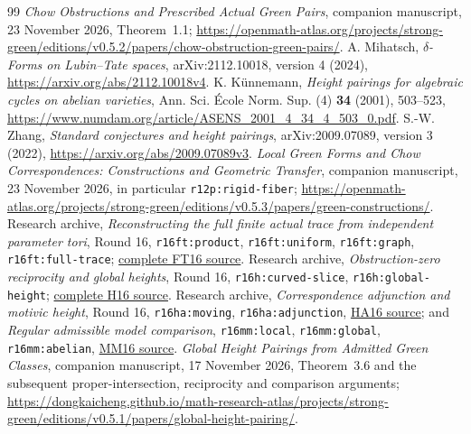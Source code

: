 \documentclass[11pt]{article}
\theoremstyle{definition}
\numberwithin{equation}{section}
\begin{document}
\begin{thebibliography}{99}
 \emph{Chow Obstructions and Prescribed Actual Green Pairs}, companion manuscript, 23 November 2026, Theorem~1.1; \url{https://openmath-atlas.org/projects/strong-green/editions/v0.5.2/papers/chow-obstruction-green-pairs/}.
 A. Mihatsch, \emph{$\delta$-Forms on Lubin--Tate spaces}, arXiv:2112.10018, version 4 (2024), \url{https://arxiv.org/abs/2112.10018v4}.
 K. K\"unnemann, \emph{Height pairings for algebraic cycles on abelian varieties}, Ann. Sci. \'Ecole Norm. Sup. (4) \textbf{34} (2001), 503--523, \url{https://www.numdam.org/article/ASENS_2001_4_34_4_503_0.pdf}.
 S.-W. Zhang, \emph{Standard conjectures and height pairings}, arXiv:2009.07089, version 3 (2022), \url{https://arxiv.org/abs/2009.07089v3}.
 \emph{Local Green Forms and Chow Correspondences: Constructions and Geometric Transfer}, companion manuscript, 23 November 2026, in particular \texttt{r12p:rigid-fiber}; \url{https://openmath-atlas.org/projects/strong-green/editions/v0.5.3/papers/green-constructions/}.
 Research archive, \emph{Reconstructing the full finite actual trace from independent parameter tori}, Round 16, \texttt{r16ft:product}, \texttt{r16ft:uniform}, \texttt{r16ft:graph}, \texttt{r16ft:full-trace}; \href{https://openmath-atlas.org/projects/strong-green/editions/v0.5.2/source-files/companion/proofs/foundations/R16_full_finite_actual_trace_reconstruction.tex}{complete FT16 source}.
 Research archive, \emph{Obstruction-zero reciprocity and global heights}, Round 16, \texttt{r16h:curved-slice}, \texttt{r16h:global-height}; \href{https://openmath-atlas.org/projects/strong-green/editions/v0.5.2/source-files/companion/proofs/foundations/R16_obstruction_zero_reciprocity_and_height.tex}{complete H16 source}.
 Research archive, \emph{Correspondence adjunction and motivic height}, Round 16, \texttt{r16ha:moving}, \texttt{r16ha:adjunction}, \href{https://openmath-atlas.org/projects/strong-green/editions/v0.5.2/source-files/companion/proofs/foundations/R16_correspondence_adjunction_and_motivic_height.tex}{HA16 source}; and \emph{Regular admissible model comparison}, \texttt{r16mm:local}, \texttt{r16mm:global}, \texttt{r16mm:abelian}, \href{https://openmath-atlas.org/projects/strong-green/editions/v0.5.2/source-files/companion/proofs/foundations/R16_regular_admissible_model_comparison.tex}{MM16 source}.
 \emph{Global Height Pairings from Admitted Green Classes}, companion manuscript, 17 November 2026, Theorem~3.6 and the subsequent proper-intersection, reciprocity and comparison arguments; \url{https://dongkaicheng.github.io/math-research-atlas/projects/strong-green/editions/v0.5.1/papers/global-height-pairing/}.

\end{thebibliography}
\end{document}
